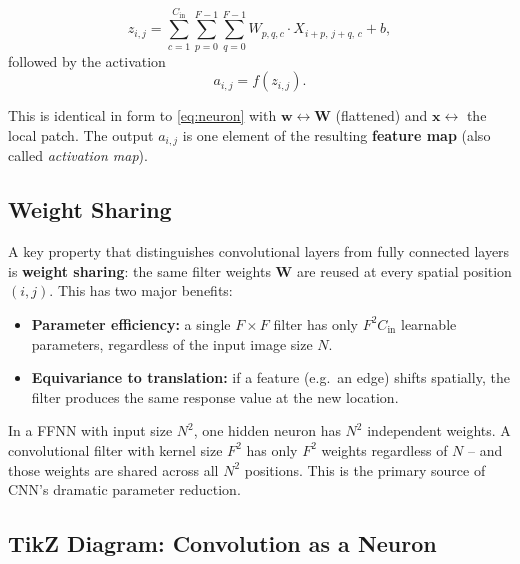 \documentclass[12pt,a4paper]{article}
\begin{document}
\begin{equation}
  z_{i,j} = \sum_{c=1}^{C_{\text{in}}}
             \sum_{p=0}^{F-1}\sum_{q=0}^{F-1}
             W_{p,q,c}\cdot X_{i+p,\,j+q,\,c} + b,
  \label{eq:conv_full}
\end{equation}
followed by the activation
\begin{equation}
  a_{i,j} = f(z_{i,j}).
  \label{eq:conv_act}
\end{equation}

This is identical in form to \cref{eq:neuron} with
$\mathbf{w} \leftrightarrow \mathbf{W}$ (flattened) and
$\mathbf{x} \leftrightarrow$ the local patch.  The output $a_{i,j}$ is one
element of the resulting \textbf{feature map} (also called \emph{activation
map}).

\subsection{Weight Sharing}
\label{subsec:weight_sharing}

A key property that distinguishes convolutional layers from fully connected
layers is \textbf{weight sharing}: the same filter weights $\mathbf{W}$ are
reused at every spatial position $(i,j)$.  This has two major benefits:

\begin{itemize}[leftmargin=2em]
  \item \textbf{Parameter efficiency:} a single $F\times F$ filter has only
        $F^2 C_{\text{in}}$ learnable parameters, regardless of the input
        image size $N$.
  \item \textbf{Equivariance to translation:} if a feature (e.g.\ an edge)
        shifts spatially, the filter produces the same response value at the
        new location.
\end{itemize}

\begin{keyinsight}[title=Key Insight: Weight Sharing]
In a FFNN with input size $N^2$, one hidden neuron has $N^2$ independent
weights.  A convolutional filter with kernel size $F^2$ has only $F^2$
weights regardless of $N$ -- and those weights are shared across all $N^2$
positions.  This is the primary source of CNN's dramatic parameter reduction.
\end{keyinsight}

\subsection{TikZ Diagram: Convolution as a Neuron}
\label{subsec:conv_diagram}
\end{document}
